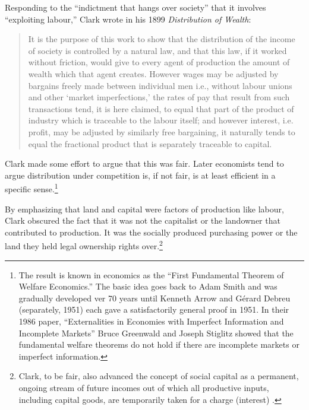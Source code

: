  Responding to the ``indictment that hangs over society'' that it involves ``exploiting labour,'' Clark wrote in his 1899 \textit{Distribution of Wealth}:
\begin{quotation}
 It is the purpose of this work to show that the distribution of the income of society is controlled by a natural law, and that this law, if it worked without friction, would give to every agent of production the amount of wealth which that agent creates. However wages may be adjusted by bargains freely made between individual men i.e., without labour unions and other `market imperfections,' the rates of pay that result from such transactions tend, it is here claimed, to equal that part of the product of industry which is traceable to the labour itself; and however interest, i.e. profit, may be adjusted by similarly free bargaining, it naturally tends to equal the fractional product that is separately traceable to capital. 
\end{quotation}
Clark made some effort to argue that this was fair. %
Later economists tend to argue distribution under competition is, if not fair,  is at least efficient in a specific sense.\footnote{The result is known  in economics as the ``First Fundamental Theorem of Welfare Economics.'' The basic idea goes back to Adam Smith and was gradually developed  ver 70 years until Kenneth Arrow and Gérard Debreu (separately, 1951) each gave  a satisfactorily general proof in 1951. In their 1986 paper, ``Externalities in Economies with Imperfect Information and Incomplete Markets''
Bruce Greenwald and Joseph Stiglitz showed that the fundamental welfare theorems do not hold if there are incomplete markets or imperfect information.}

By emphasizing that land and capital were factors of production like labour, Clark obscured the fact that it was not the capitalist or the landowner that contributed to production. It was the socially produced purchasing power or the land they held legal ownership rights over.\footnote{Clark, to be fair, also advanced the concept of social capital as a permanent, ongoing stream of future incomes out of which all productive inputs, including capital goods, are temporarily taken for a charge (interest) \cite{CLARKBRITANICA}. %
}

